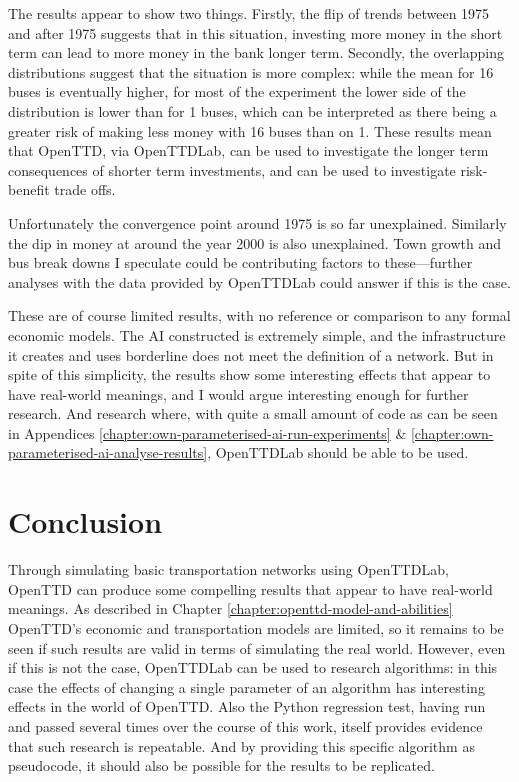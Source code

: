 \documentclass[logo,msc,dsti]{style/infthesis}    %
\begin{document}
{The results appear to show two things. Firstly, the flip of trends between 1975 and after 1975 suggests that in this situation, investing more money in the short term can lead to more money in the bank longer term. Secondly, the overlapping distributions suggest that the situation is more complex: while the mean for 16 buses is eventually higher, for most of the experiment the lower side of the distribution is lower than for 1 buses, which can be interpreted as there being a greater risk of making less money with 16 buses than on 1. These results mean that OpenTTD, via OpenTTDLab, can be used to investigate the longer term consequences of shorter term investments, and can be used to investigate risk-benefit trade offs.

Unfortunately the convergence point around 1975 is so far unexplained. Similarly the dip in money at around the year 2000 is also unexplained. Town growth and bus break downs I speculate could be contributing factors to these---further analyses with the data provided by OpenTTDLab could answer if this is the case.

These are of course limited results, with no reference or comparison to any formal economic models. The AI constructed is extremely simple, and the infrastructure it creates and uses borderline does not meet the definition of a  network. But in spite of this simplicity, the results show some interesting effects that appear to have real-world meanings, and I would argue interesting enough for further research. And research where, with quite a small amount of code as can be seen in Appendices \ref{chapter:own-parameterised-ai-run-experiments} \& \ref{chapter:own-parameterised-ai-analyse-results}, OpenTTDLab should be able to be used.


\section{Conclusion}

Through simulating basic transportation networks using OpenTTDLab, OpenTTD can produce some compelling results that appear to have real-world meanings. As described in Chapter \ref{chapter:openttd-model-and-abilities} OpenTTD's economic and transportation models are limited, so it remains to be seen if such results are valid in terms of simulating the real world. However, even if this is not the case, OpenTTDLab can be used to research algorithms: in this case the effects of changing a single parameter of an algorithm has interesting effects in the world of OpenTTD. Also the Python regression test, having run and passed several times over the course of this work, itself provides evidence that such research is repeatable. And by providing this specific algorithm as pseudocode, it should also be possible for the results to be replicated.

}
\end{document}
